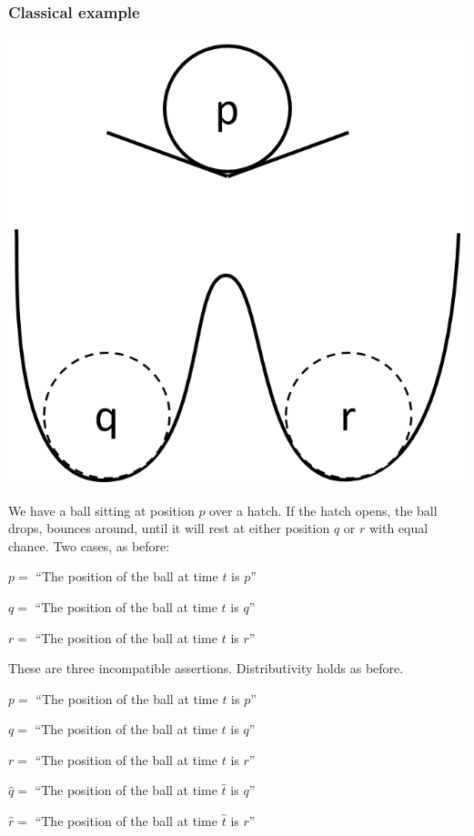 \documentclass[11pt, executivepaper]{article}
\begin{document}
\subsubsection{Classical example}
\begin{center}
\includegraphics[scale=.3]{Balldrop.png}
\end{center}

We have a ball sitting at position $p$ over a hatch. If the hatch opens, the ball drops, bounces around, until it will rest at either position $q$ or $r$ with equal chance. Two cases, as before:

\begin{description}
    \item $p =$ ``The position of the ball at time $t$ is $p$''
    \item $q =$ ``The position of the ball at time $t$ is $q$''
    \item $r =$ ``The position of the ball at time $t$ is $r$''
\end{description}

These are three incompatible assertions. Distributivity holds as before.

\begin{description}
    \item $p =$ ``The position of the ball at time $t$ is $p$''
    \item $q =$ ``The position of the ball at time $t$ is $q$''
    \item $r =$ ``The position of the ball at time $t$ is $r$''
    \item $\hat{q} =$ ``The position of the ball at time $\hat{t}$ is $q$''
    \item $\hat{r} =$ ``The position of the ball at time $\hat{t}$ is $r$''
\end{description}
\end{document}
